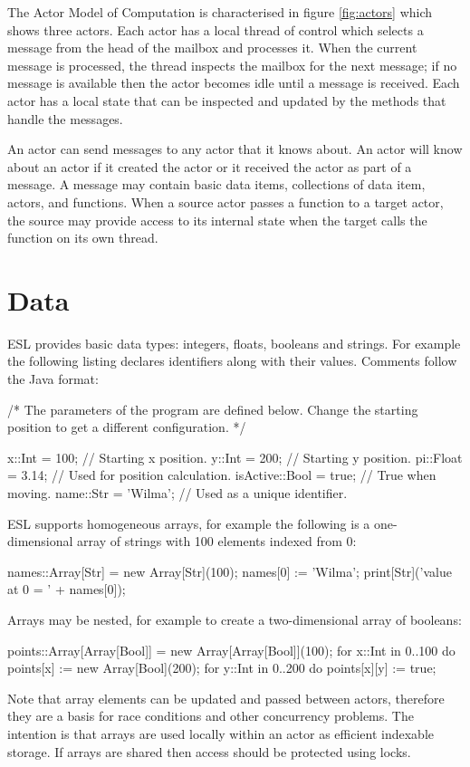 \documentclass[5p,times]{elsarticle}
\begin{document}
The Actor Model of Computation is characterised in figure \ref{fig:actors} which shows three actors. Each actor has a local thread of control which selects a message from the head of the mailbox and processes it. When the current message is processed, the thread inspects the mailbox for the next message; if no message is available then the actor becomes idle until a message is received. Each actor has a local state that can be inspected and updated by the methods that handle the messages.

An actor can send messages to any actor that it knows about. An actor will know about an actor if it created the actor or it received the actor as part of a message. A message may contain basic data items, collections of data item, actors, and functions. When a source actor passes a function to a target actor, the source may provide access to its internal state when the target calls the function on its own thread.




\section{Data}


ESL provides basic data types: integers, floats, booleans and strings. For example the following listing declares identifiers along with their values. Comments follow the Java format:
\begin{ESL}
/* The parameters of the program are defined below.
   Change the starting position to get a different
   configuration. */
   
x::Int         = 100;     // Starting x position.
y::Int         = 200;     // Starting y position.
pi::Float      = 3.14;    // Used for position calculation.
isActive::Bool = true;    // True when moving.
name::Str      = 'Wilma'; // Used as a unique identifier.
\end{ESL}
ESL supports homogeneous arrays, for example the following is a one- dimensional array of strings with 100 elements indexed from 0:
\begin{ESL}
names::Array[Str] = new Array[Str](100);
names[0] := 'Wilma';
print[Str]('value at 0 = ' + names[0]);
\end{ESL}
Arrays may be nested, for example to create a two-dimensional array of booleans:
\begin{ESL}
points::Array[Array[Bool]] = new Array[Array[Bool]](100);
for x::Int in 0..100 do {
  points[x] := new Array[Bool](200);
  for y::Int in 0..200 do {
    points[x][y] := true;
  }
}
\end{ESL}
Note that array elements can be updated and passed between actors, therefore they are a basis for race conditions and other concurrency problems. The intention is that arrays are used locally within an actor as efficient indexable storage. If arrays are shared then access should be protected using locks.
\end{document}
